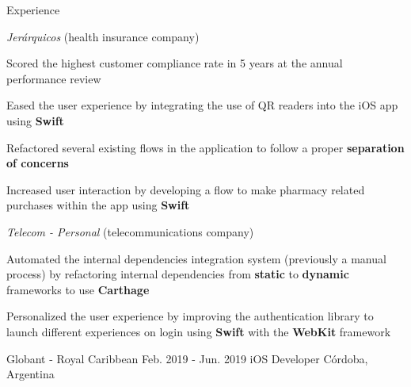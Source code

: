 \documentclass{curriculum}
\begin{document}
\begin{cvsection}{Experience}
\begin{sectionitemlist}
        \pagebreak %
        \item{\textit{Jerárquicos} (health insurance company)}
            \begin{sectionitemlist}
            \item{
                Scored the highest customer compliance rate
                in 5 years at the annual performance review
            }
            \item{
                Eased the user experience by integrating the use of
                QR readers into the iOS app using \textbf{Swift}
            }
            \item{
                Refactored several existing flows in the application
                to follow a proper \textbf{separation of concerns}
            }
            \item {
                Increased user interaction by developing a flow to make pharmacy
                related purchases within the app using \textbf{Swift}
            }
            \end{sectionitemlist}

        \item{\textit{Telecom - Personal} (telecommunications company)}
            \begin{sectionitemlist}
            \item{
                Automated the internal dependencies integration system
                (previously a manual process) by refactoring internal dependencies
                from \textbf{static} to \textbf{dynamic} frameworks to use \textbf{Carthage}
            }
            \item{
                Personalized the user experience by improving the authentication
                library to launch different experiences on login using
                \textbf{Swift} with the \textbf{WebKit} framework
            }
            \end{sectionitemlist}

        \end{sectionitemlist}


    \makesectionitemheader
        {Globant - Royal Caribbean}                         {Feb. 2019 - Jun. 2019}
        {iOS Developer}                                         {Córdoba, Argentina}


\end{cvsection}
\end{document}
